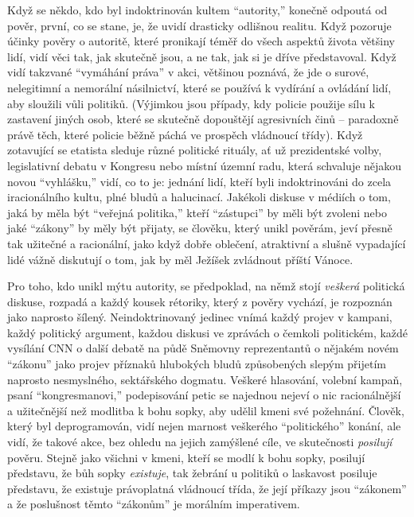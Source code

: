 \documentclass{book}
\begin{document}
Když se někdo, kdo byl indoktrinován kultem \enquote{autority,} konečně odpoutá od pověr, první, co se stane, je, že uvidí drasticky odlišnou realitu. Když pozoruje účinky pověry o autoritě, které pronikají téměř do všech aspektů života většiny lidí, vidí věci tak, jak skutečně jsou, a ne tak, jak si je dříve představoval. Když vidí takzvané \enquote{vymáhání práva} v akci, většinou poznává, že jde o surové, nelegitimní a nemorální násilnictví, které se používá k vydírání a ovládání lidí, aby sloužili vůli politiků. (Výjimkou jsou případy, kdy policie použije sílu k zastavení jiných osob, které se skutečně dopouštějí agresivních činů -- paradoxně právě těch, které policie běžně páchá ve prospěch vládnoucí třídy). Když zotavující se etatista sleduje různé politické rituály, ať už prezidentské volby, legislativní debatu v Kongresu nebo místní územní radu, která schvaluje nějakou novou \enquote{vyhlášku,} vidí, co to je: jednání lidí, kteří byli indoktrinováni do zcela iracionálního kultu, plné bludů a halucinací. Jakékoli diskuse v médiích o tom, jaká by měla být \enquote{veřejná politika,} kteří \enquote{zástupci} by měli být zvoleni nebo jaké \enquote{zákony} by měly být přijaty, se člověku, který unikl pověrám, jeví přesně tak užitečné a racionální, jako když dobře oblečení, atraktivní a slušně vypadající lidé vážně diskutují o tom, jak by měl Ježíšek zvládnout příští Vánoce.

Pro toho, kdo unikl mýtu autority, se předpoklad, na němž stojí \emph{veškerá} politická diskuse, rozpadá a každý kousek rétoriky, který z pověry vychází, je rozpoznán jako naprosto šílený. Neindoktrinovaný jedinec vnímá každý projev v kampani, každý politický argument, každou diskusi ve zprávách o čemkoli politickém, každé vysílání CNN o další debatě na půdě Sněmovny reprezentantů o nějakém novém \enquote{zákonu} jako projev příznaků hlubokých bludů způsobených slepým přijetím naprosto nesmyslného, sektářského dogmatu. Veškeré hlasování, volební kampaň, psaní \enquote{kongresmanovi,} podepisování petic se najednou nejeví o nic racionálnější a užitečnější než modlitba k bohu sopky, aby udělil kmeni své požehnání. Člověk, který byl deprogramován, vidí nejen marnost veškerého \enquote{politického} konání, ale vidí, že takové akce, bez ohledu na jejich zamýšlené cíle, ve skutečnosti \emph{posilují} pověru. Stejně jako všichni v kmeni, kteří se modlí k bohu sopky, posilují představu, že bůh sopky \emph{existuje}, tak žebrání u politiků o laskavost posiluje představu, že existuje právoplatná vládnoucí třída, že její příkazy jsou \enquote{zákonem} a že poslušnost těmto \enquote{zákonům} je morálním imperativem.
\end{document}
